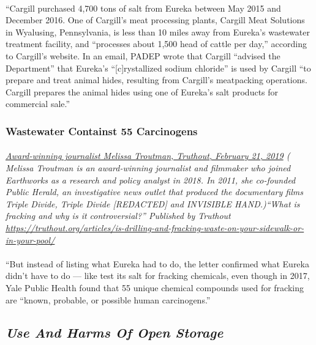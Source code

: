 \documentclass{article}
\begin{document}
\paragraph{}
``Cargill purchased 4,700 tons of salt from Eureka between May 2015 and December 2016. One of Cargill’s meat processing plants, Cargill Meat Solutions in Wyalusing, Pennsylvania, is less than 10 miles away from Eureka’s wastewater treatment facility, and “processes about 1,500 head of cattle per day,” according to Cargill’s website. In an email, PADEP wrote that Cargill “advised the Department” that Eureka’s “[c]rystallized sodium chloride” is used by Cargill “to prepare and treat animal hides, resulting from Cargill’s meatpacking operations. Cargill prepares the animal hides using one of Eureka’s salt products for commercial sale.”

\subsubsection{Wastewater Containst 55 Carcinogens}
\paragraph{}
\small
\textit{
\underline{Award-winning journalist Melissa Troutman, Truthout, February 21, 2019}
( Melissa Troutman is an award-winning journalist and filmmaker who joined Earthworks as a research and policy analyst in 2018. In 2011, she co-founded Public Herald, an investigative news outlet that produced the documentary films Triple Divide, Triple Divide [REDACTED] and INVISIBLE HAND.)``What is fracking and why is it controversial?'' Published by Truthout
\url{https://truthout.org/articles/is-drilling-and-fracking-waste-on-your-sidewalk-or-in-your-pool/}}
\normalsize
\paragraph{}
``But instead of listing what Eureka had to do, the letter confirmed what Eureka didn’t have to do — like test its salt for fracking chemicals, even though in 2017, Yale Public Health found that 55 unique chemical compounds used for fracking are “known, probable, or possible human carcinogens.”

\subsection{\emph{Use And Harms Of Open Storage}}
\end{document}
